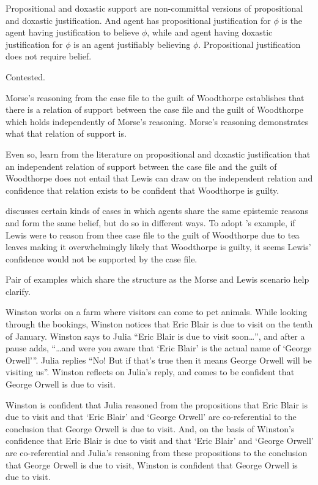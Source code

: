 \documentclass[10pt]{article}
\begin{document}
Propositional and doxastic support are non-committal versions of propositional and doxastic justification.
And agent has propositional justification for \(\phi\) is the agent having justification to believe \(\phi\), while and agent having doxastic justification for \(\phi\) is an agent justifiably believing \(\phi\).
Propositional justification does not require belief.

Contested.

Morse's reasoning from the case file to the guilt of Woodthorpe establishes that there is a relation of support between the case file and the guilt of Woodthorpe which holds independently of Morse's reasoning.
Morse's reasoning demonstrates what that relation of support is.

Even so, learn from the literature on propositional and doxastic justification that an independent relation of support between the case file and the guilt of Woodthorpe does not entail that Lewis can draw on the independent relation and confidence that relation exists to be confident that Woodthorpe is guilty.

\textcite{Turri:2010aa} discusses certain kinds of cases in which agents share the same {\color{red} epistemic reasons} and form the same belief, but do so in different ways.
To adopt \citeauthor{Turri:2010aa}'s example, if Lewis were to reason from thee case file to the guilt of Woodthorpe due to tea leaves making it overwhelmingly likely that Woodthorpe is guilty, it seems Lewis' confidence would not be supported by the case file.

Pair of examples which share the structure as the Morse and Lewis scenario help clarify.

\begin{scenario}
  Winston works on a farm where visitors can come to pet animals.
  While looking through the bookings, Winston notices that Eric Blair is due to visit on the tenth of January.
  Winston says to Julia ``Eric Blair is due to visit soon\dots'', and after a pause adds, ``\dots and were you aware that `Eric Blair' is the actual name of `George Orwell'''.
  Julia replies ``No! But if that's true then it means George Orwell will be visiting us''.
  Winston reflects on Julia's reply, and comes to be confident that George Orwell is due to visit.
\end{scenario}

Winston is confident that Julia reasoned from the propositions that Eric Blair is due to visit and that `Eric Blair' and `George Orwell' are co-referential to the conclusion that George Orwell is due to visit.
And, on the basis of Winston's confidence that Eric Blair is due to visit and that `Eric Blair' and `George Orwell' are co-referential and Julia's reasoning from these propositions to the conclusion that George Orwell is due to visit, Winston is confident that George Orwell is due to visit.
\end{document}
